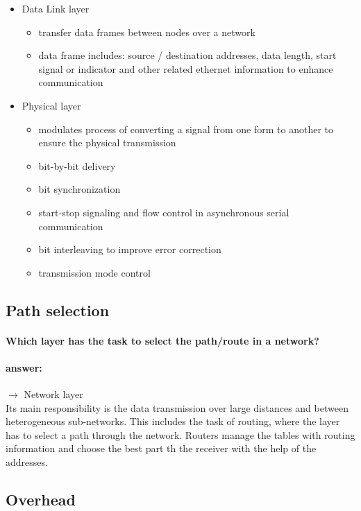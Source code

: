 \documentclass[a4paper,12pt]{article}
\begin{document}
\begin{itemize}
	\item Data Link layer
	\begin{itemize}
		\item  transfer data frames between nodes over a network
		\item  data frame includes: source / destination addresses, data length, start signal or indicator and other related ethernet information to enhance communication		 
	\end{itemize}

	\item Physical layer
	\begin{itemize}
		\item  modulates process of converting a signal from one form to another to ensure the physical transmission
		\item  bit-by-bit delivery
		\item  bit synchronization
		\item  start-stop signaling and flow control in asynchronous serial communication
		\item  bit interleaving to improve error correction
		\item  transmission mode control
	\end{itemize}

\end{itemize}
 
 \subsection{Path selection}
 \paragraph{Which layer has the task to select the path/route in a network?}
 \paragraph{answer:} 
 $\rightarrow$ Network layer \\
 Its main responsibility is the data transmission over large distances and between heterogeneous sub-networks. This includes the task of routing, where the layer has to select a path through the network. Routers manage the tables with routing information and choose the best part th the receiver with the help of the addresses. 
 
 \subsection{Overhead}
\end{document}
